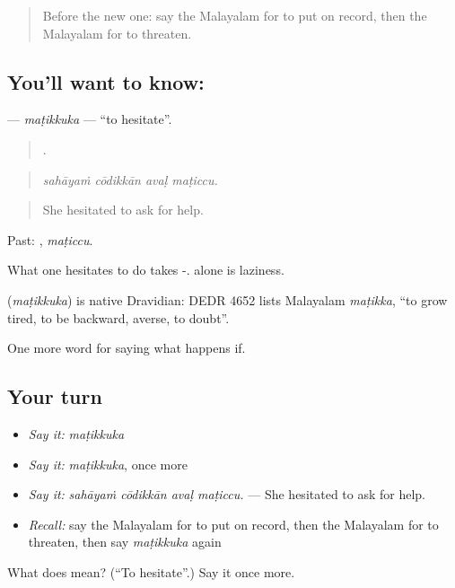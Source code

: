 \label{lesson:ML-C451-matikkuka}



\begin{quote}
Before the new one: say the Malayalam for to put on record, then the Malayalam for to threaten.
\end{quote}

\subsection*{You'll want to know: }
\textbf{} — \emph{maṭikkuka} — \textquotedblleft{}to hesitate\textquotedblright{}.

\begin{quote}
   .
\end{quote}

\begin{quote}
\emph{sahāyaṁ cōdikkān avaḷ maṭiccu.}
\end{quote}

\begin{quote}
She hesitated to ask for help.
\end{quote}

Past: , \emph{maṭiccu}.

What one hesitates to do takes -.  alone is laziness.

\begin{cousinweb}
\textbf{} (\emph{maṭikkuka}) is native Dravidian: DEDR 4652 lists Malayalam \emph{maṭikka}, \textquotedblleft{}to grow tired, to be backward, averse, to doubt\textquotedblright{}.
\end{cousinweb}

\begin{grammarlens}[title={What you've built}]
One more word for saying what happens if.
\end{grammarlens}

\subsection*{Your turn}
\begin{itemize}
\raggedright
  \item \emph{Say it:} \emph{maṭikkuka}
  \item \emph{Say it:} \emph{maṭikkuka}, once more
  \item \emph{Say it:} \emph{sahāyaṁ cōdikkān avaḷ maṭiccu.} — She hesitated to ask for help.
  \item \emph{Recall:} say the Malayalam for to put on record, then the Malayalam for to threaten, then say \emph{maṭikkuka} again
\end{itemize}

\begin{tcolorbox}[breakable,colback=teal!4,colframe=teal!35!black,title={Before you move on}]
What does  mean? (\textquotedblleft{}To hesitate\textquotedblright{}.) Say it once more.
\end{tcolorbox}
